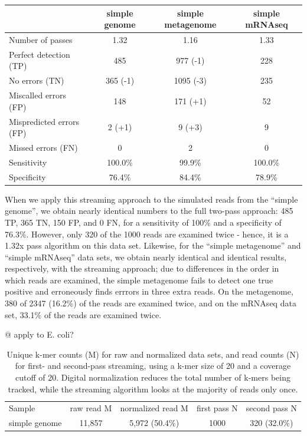 \documentclass{article}
\begin{document}
\begin{table}
\begin{tabular}{|l|c||c||c|}
\hline
& simple genome & simple metagenome & simple mRNAseq \\
\hline
Number of passes & 1.32 & 1.16 & 1.33 \\
\hline
Perfect detection (TP) & 485 & 977 (-1) & 228 \\
No errors (TN) & 365 (-1) & 1095 (-3) & 235 \\
Miscalled errors (FP) & 148 & 171 (+1) & 52 \\
Mispredicted errors (FP) & 2 (+1) & 9 (+3) & 9 \\
Missed errors (FN) & 0 & 2 & 0 \\
\hline
Sensitivity & 100.0\% & 99.9\% & 100.0\% \\
Specificity & 76.4\% & 84.4\% & 78.9\% \\
\hline
\end{tabular}
\label{tab:spectra_streaming}
\end{table}

When we apply this streaming approach to the simulated reads from the
``simple genome'', we obtain nearly identical numbers to the full two-pass
approach: 485 TP, 365 TN, 150 FP, and 0 FN, for a sensitivity of 100\%
and a specificity of 76.3\%.  However, only 320 of the 1000 reads are
examined twice - hence, it is a 1.32x pass algorithm on this data set.
Likewise, for the ``simple metagenome''
and ``simple mRNAseq'' data sets, we obtain nearly identical and
identical results, respectively, with the streaming approach; due to
differences in the order in which reads are examined, the simple
metagenome fails to detect one true positive and erroneously finds
errrors in three extra reads.  On the metagenome, 380 of 2347 (16.2\%) of
the reads are examined twice, and on the mRNAseq data set, 33.1\% of the
reads are examined twice.

@ apply to E. coli?

\begin{table}
\begin{tabular}{|l|c|c|c|c|}
\hline
Sample & raw read M & normalized read M & first pass N & second pass N \\
simple genome & 11,857 & 5,972 (50.4\%) & 1000 & 320 (32.0\%) \\
\hline
\end{tabular}
\label{tab:streaming_counts}

\caption{Unique k-mer counts (M) for raw and normalized data sets, and
read counts (N) for first- and second-pass streaming, using a k-mer size
of 20 and a coverage cutoff of 20.  Digital normalization reduces the
total number of k-mers being tracked, while the streaming algorithm
looks at the majority of reads only once.}
\end{table}
\end{document}
